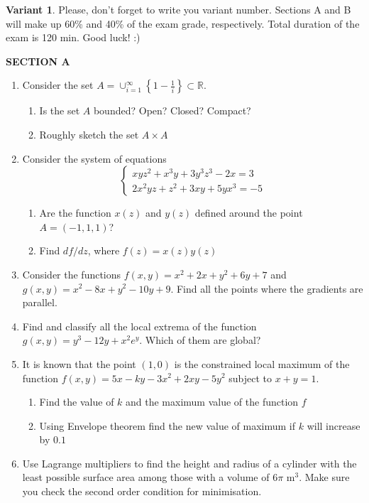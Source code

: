 \documentclass[12pt,a4paper]{article}
\begin{document}
\thispagestyle{empty}
\textbf{Variant 1}. Please, don't forget to write you variant number. Sections A and B will make up 60\% and 40\% of the exam grade, respectively. Total duration of the exam is 120 min. Good luck! :) 

\vspace{10pt}

\textbf{SECTION A}


\begin{enumerate}
\item Consider the set $A=\cup_{i=1}^{\infty} \left\{ 1-\frac{1}{i} \right\} \subset \mathbb{R}$.
\begin{enumerate}
\item Is the set $A$ bounded? Open? Closed? Compact?
\item Roughly sketch the set $A \times A$
\end{enumerate}

\item Consider the system of equations 
\[
\begin{cases}
xyz^2+x^3y+3y^3z^3-2x=3 \\
2x^2yz+z^2+3xy+5yx^3=-5
\end{cases}
\]
\begin{enumerate}
\item Are the function $x(z)$ and $y(z)$ defined around the point $A=(-1,1,1)$?
\item Find $df/dz$, where $f(z)=x(z)y(z)$
\end{enumerate}
\item Consider the functions $f(x,y)=x^2+2x+y^2+6y+7$ and $g(x,y)=x^2-8x+y^2-10y+9$. Find all the points where the gradients are parallel.
\item Find and classify all the local extrema of the function $g(x,y)=y^3 -12y+x^2e^y$. Which of them are global?
\item It is known that the point $(1,0)$ is the constrained local maximum of the function $f(x,y)=5x-ky-3x^2+2xy-5y^2$ subject to $x+y=1$.
\begin{enumerate}
\item Find the value of $k$ and the maximum value of the function $f$
\item Using Envelope theorem find the new value of maximum if $k$ will increase by $0.1$
\end{enumerate}
\item Use Lagrange multipliers to find the height and radius of a cylinder with the least possible
surface area among those with a volume of $6\pi$ m$^3$. Make sure you check the second order
condition for minimisation.
\end{enumerate}
\end{document}

